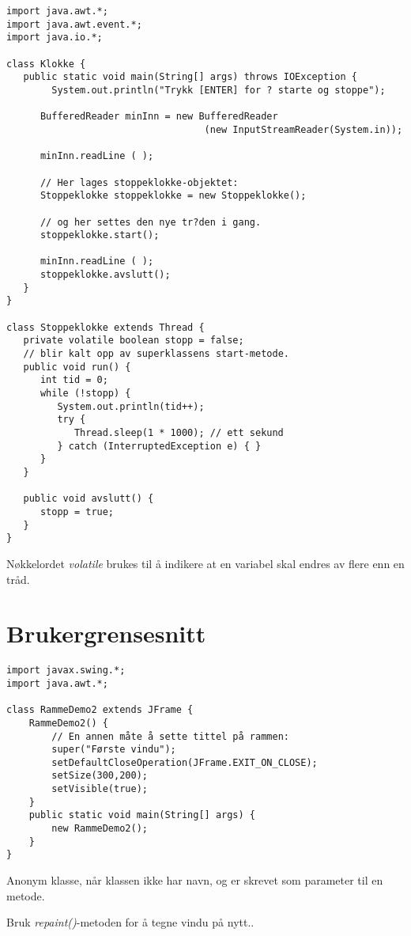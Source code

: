\documentclass[11pt]{article}
\begin{document}
\begin{verbatim}
import java.awt.*;
import java.awt.event.*;
import java.io.*;

class Klokke {
   public static void main(String[] args) throws IOException {
        System.out.println("Trykk [ENTER] for ? starte og stoppe");
   
      BufferedReader minInn = new BufferedReader
                                   (new InputStreamReader(System.in));

      minInn.readLine ( );
 
      // Her lages stoppeklokke-objektet:
      Stoppeklokke stoppeklokke = new Stoppeklokke();

      // og her settes den nye tr?den i gang.
      stoppeklokke.start();

      minInn.readLine ( );
      stoppeklokke.avslutt();
   }
}

class Stoppeklokke extends Thread {
   private volatile boolean stopp = false;
   // blir kalt opp av superklassens start-metode.
   public void run() {
      int tid = 0;
      while (!stopp) {
         System.out.println(tid++);
         try {
            Thread.sleep(1 * 1000); // ett sekund
         } catch (InterruptedException e) { }
      }
   }

   public void avslutt() {
      stopp = true;
   }
}
\end{verbatim}

Nøkkelordet \emph{volatile} brukes til å indikere at en variabel skal
endres av flere enn en tråd.
\section{Brukergrensesnitt}
\label{sec-19}


\begin{verbatim}
import javax.swing.*; 
import java.awt.*;

class RammeDemo2 extends JFrame { 
    RammeDemo2() {
        // En annen måte å sette tittel på rammen:
        super("Første vindu");                     
        setDefaultCloseOperation(JFrame.EXIT_ON_CLOSE);
        setSize(300,200);        
        setVisible(true);
    } 
    public static void main(String[] args) {
        new RammeDemo2();
    }
}
\end{verbatim}

Anonym klasse, når klassen ikke har navn, og er skrevet som parameter
til en metode.

Bruk \emph{repaint()}-metoden for å tegne vindu på nytt..
\end{document}
